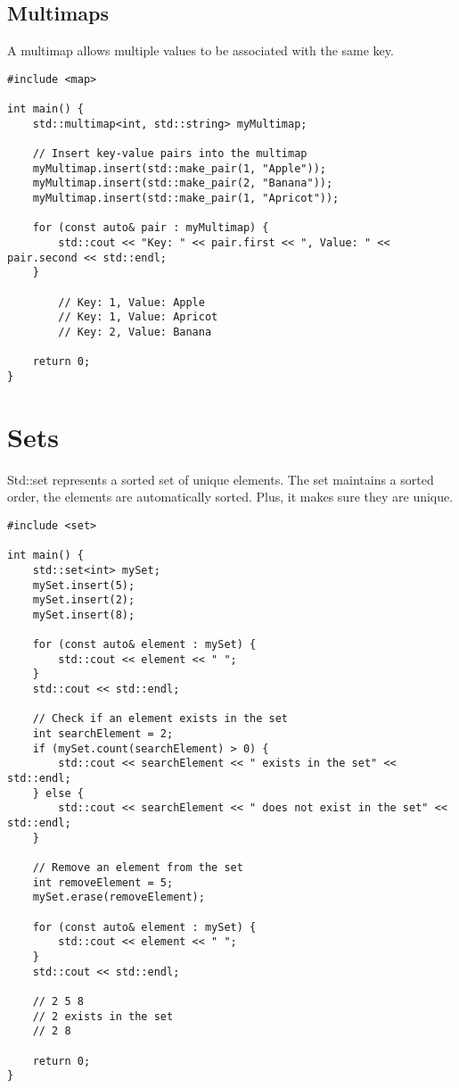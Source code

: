 \subsection{Multimaps}

A multimap allows multiple values to be associated with the same key. 

\begin{verbatim}
#include <map>

int main() {
    std::multimap<int, std::string> myMultimap;

    // Insert key-value pairs into the multimap
    myMultimap.insert(std::make_pair(1, "Apple"));
    myMultimap.insert(std::make_pair(2, "Banana"));
    myMultimap.insert(std::make_pair(1, "Apricot"));

    for (const auto& pair : myMultimap) {
        std::cout << "Key: " << pair.first << ", Value: " << pair.second << std::endl;
    }

        // Key: 1, Value: Apple
        // Key: 1, Value: Apricot
        // Key: 2, Value: Banana

    return 0;
}
\end{verbatim}

\section{Sets}

Std::set represents a sorted set of unique elements. The set maintains a sorted order,
the elements are automatically sorted. Plus, it makes sure they are unique.

\begin{verbatim}
#include <set>

int main() {
    std::set<int> mySet;
    mySet.insert(5);
    mySet.insert(2);
    mySet.insert(8);

    for (const auto& element : mySet) {
        std::cout << element << " ";
    }
    std::cout << std::endl;

    // Check if an element exists in the set
    int searchElement = 2;
    if (mySet.count(searchElement) > 0) {
        std::cout << searchElement << " exists in the set" << std::endl;
    } else {
        std::cout << searchElement << " does not exist in the set" << std::endl;
    }

    // Remove an element from the set
    int removeElement = 5;
    mySet.erase(removeElement);

    for (const auto& element : mySet) {
        std::cout << element << " ";
    }
    std::cout << std::endl;
    
    // 2 5 8
    // 2 exists in the set
    // 2 8

    return 0;
}
\end{verbatim}


